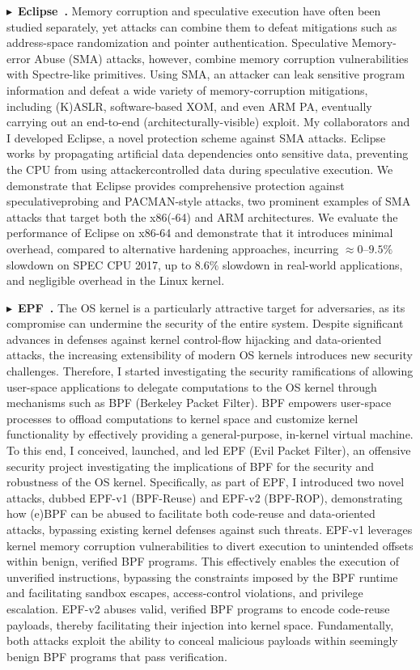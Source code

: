 \documentclass[10pt,letterpaper]{article}
\newcommand{\project}[2]{\par\Needspace{6\baselineskip}\noindent
  $\blacktriangleright$~\textbf{#1~\cite{#2}.}}
\begin{document}
\project{Eclipse}{eclipse}
Memory corruption and speculative execution have often been studied separately,
yet attacks can combine them to defeat mitigations such as address-space
randomization and pointer authentication.
Speculative Memory-error Abuse (SMA) attacks, however, combine memory
corruption vulnerabilities with Spectre-like primitives. Using SMA, an
attacker can leak sensitive program information and defeat a wide variety of
memory-corruption mitigations, including (K)ASLR, software-based XOM,
and even ARM PA, eventually carrying out an end-to-end (architecturally-visible)
exploit. My collaborators and I developed Eclipse,
a novel protection scheme against
SMA attacks. Eclipse works by propagating artificial data dependencies onto
sensitive data, preventing the CPU from using attackercontrolled data
during speculative execution. We demonstrate that
Eclipse provides comprehensive protection against speculativeprobing
and PACMAN-style attacks, two prominent examples of
SMA attacks that target both the x86(-64) and ARM architectures.
We evaluate the performance of Eclipse on x86-64 and demonstrate that
it introduces minimal overhead, compared to alternative
hardening approaches, incurring $\approx 0$--$9.5\%$ slowdown on SPEC
CPU 2017, up to $8.6\%$ slowdown in real-world applications, and
negligible overhead in the Linux kernel.

\project{EPF}{epf}
The OS kernel is a particularly attractive target for adversaries,
as its compromise can undermine the security of the entire system.
Despite significant advances in defenses against kernel control-flow
hijacking and data-oriented attacks, the increasing extensibility of
modern OS kernels introduces new security challenges.
Therefore, I started investigating the security ramifications of
allowing user-space applications to delegate computations to the OS
kernel through mechanisms such as BPF (Berkeley Packet Filter).
BPF empowers user-space processes to offload computations to kernel
space and customize kernel functionality by effectively providing
a general-purpose, in-kernel virtual machine. To this end,
I conceived, launched, and led EPF (Evil Packet Filter),
an offensive security project investigating the implications
of BPF for the security and robustness of the OS kernel.
Specifically, as part of EPF, I introduced two novel attacks,
dubbed EPF-v1 (BPF-Reuse) and EPF-v2 (BPF-ROP), demonstrating
how (e)BPF can be abused to facilitate both code-reuse and
data-oriented attacks, bypassing existing kernel defenses against
such threats. EPF-v1 leverages kernel memory corruption vulnerabilities
to divert execution to unintended offsets within benign,
verified BPF programs. This effectively enables the execution of
unverified instructions, bypassing the constraints imposed by the BPF
runtime and facilitating sandbox escapes, access-control violations,
and privilege escalation. EPF-v2 abuses valid, verified BPF programs to 
encode code-reuse payloads, thereby facilitating their injection into 
kernel space. Fundamentally, both attacks exploit the ability to conceal 
malicious payloads within seemingly benign BPF programs that pass 
verification.
\end{document}
